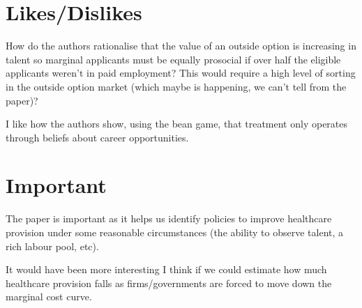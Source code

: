 \documentclass{article}
\begin{document}
\section*{Likes/Dislikes}

How do the authors rationalise that the value of an outside option is increasing 
in talent so marginal applicants must be equally prosocial if over half the eligible 
applicants weren't in paid employment? This would require a high level of
sorting in the outside option market (which maybe is happening, we can't tell 
from the paper)?

I like how the authors show, using the bean game, that treatment only operates 
through beliefs about career opportunities.


\section*{Important}


The paper is important as it helps us identify policies to improve healthcare 
provision under some reasonable circumstances (the ability to observe talent, 
a rich labour pool, etc).


It would have been more interesting I think if we could estimate how much 
healthcare provision falls as firms/governments are forced to move down the 
marginal cost curve.
\end{document}
